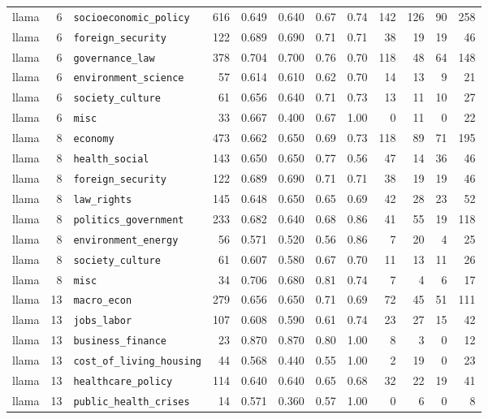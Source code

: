 \begin{landscape}
\begin{longtable}{@{}l r l r r r r r r r r r@{}}
llama & 6 & \texttt{socioeconomic\_policy} & 616 & 0.649 & 0.640 & 0.67 & 0.74 & 142 & 126 & 90 & 258\\
llama & 6 & \texttt{foreign\_security} & 122 & 0.689 & 0.690 & 0.71 & 0.71 & 38 & 19 & 19 & 46\\
llama & 6 & \texttt{governance\_law} & 378 & 0.704 & 0.700 & 0.76 & 0.70 & 118 & 48 & 64 & 148\\
llama & 6 & \texttt{environment\_science} & 57 & 0.614 & 0.610 & 0.62 & 0.70 & 14 & 13 & 9 & 21\\
llama & 6 & \texttt{society\_culture} & 61 & 0.656 & 0.640 & 0.71 & 0.73 & 13 & 11 & 10 & 27\\
llama & 6 & \texttt{misc} & 33 & 0.667 & 0.400 & 0.67 & 1.00 & 0 & 11 & 0 & 22\\
\midrule
llama & 8 & \texttt{economy} & 473 & 0.662 & 0.650 & 0.69 & 0.73 & 118 & 89 & 71 & 195\\
llama & 8 & \texttt{health\_social} & 143 & 0.650 & 0.650 & 0.77 & 0.56 & 47 & 14 & 36 & 46\\
llama & 8 & \texttt{foreign\_security} & 122 & 0.689 & 0.690 & 0.71 & 0.71 & 38 & 19 & 19 & 46\\
llama & 8 & \texttt{law\_rights} & 145 & 0.648 & 0.650 & 0.65 & 0.69 & 42 & 28 & 23 & 52\\
llama & 8 & \texttt{politics\_government} & 233 & 0.682 & 0.640 & 0.68 & 0.86 & 41 & 55 & 19 & 118\\
llama & 8 & \texttt{environment\_energy} & 56 & 0.571 & 0.520 & 0.56 & 0.86 & 7 & 20 & 4 & 25\\
llama & 8 & \texttt{society\_culture} & 61 & 0.607 & 0.580 & 0.67 & 0.70 & 11 & 13 & 11 & 26\\
llama & 8 & \texttt{misc} & 34 & 0.706 & 0.680 & 0.81 & 0.74 & 7 & 4 & 6 & 17\\
\midrule
llama & 13 & \texttt{macro\_econ} & 279 & 0.656 & 0.650 & 0.71 & 0.69 & 72 & 45 & 51 & 111\\
llama & 13 & \texttt{jobs\_labor} & 107 & 0.608 & 0.590 & 0.61 & 0.74 & 23 & 27 & 15 & 42\\
llama & 13 & \texttt{business\_finance} & 23 & 0.870 & 0.870 & 0.80 & 1.00 & 8 & 3 & 0 & 12\\
llama & 13 & \texttt{cost\_of\_living\_housing} & 44 & 0.568 & 0.440 & 0.55 & 1.00 & 2 & 19 & 0 & 23\\
llama & 13 & \texttt{healthcare\_policy} & 114 & 0.640 & 0.640 & 0.65 & 0.68 & 32 & 22 & 19 & 41\\
llama & 13 & \texttt{public\_health\_crises} & 14 & 0.571 & 0.360 & 0.57 & 1.00 & 0 & 6 & 0 & 8\\

\end{longtable}
\end{landscape}
